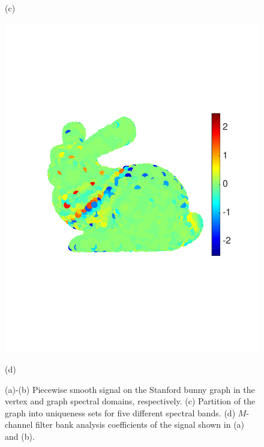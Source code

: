 \documentclass[journal, 10pt]{IEEEtran}
\begin{document}
\begin{figure}[tbh]
\begin{minipage}[m]{0.48\linewidth}
\centerline{\small{(c)}}
\end{minipage}
\begin{minipage}[m]{0.48\linewidth}
\centerline{\includegraphics[width=.8\linewidth]{fig_bunny_coef_all}}
\centerline{\small{(d)}}
\end{minipage}
\caption{(a)-(b) Piecewise smooth signal on the Stanford bunny graph \cite{bunny} in the vertex and graph spectral domains, respectively. (c) Partition of the graph into uniqueness sets for five different spectral bands. (d) $M$-channel filter bank analysis coefficients of the signal shown in (a) and (b).}\label{Fig:bunny_signal}
\end{figure}
\end{document}

